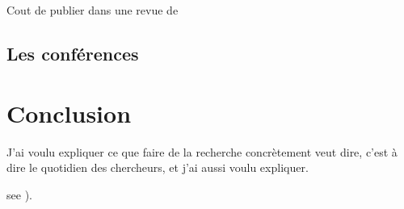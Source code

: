 \documentclass[24pt]{article}
\begin{document}
Cout de publier dans une revue de 

\subsection{Les conférences}



\section{Conclusion}
J'ai voulu expliquer ce que faire de la recherche concrètement veut dire, c'est à dire le quotidien des chercheurs, et j'ai aussi voulu expliquer.

see \citep{Snake}).


%
%




\end{document}
